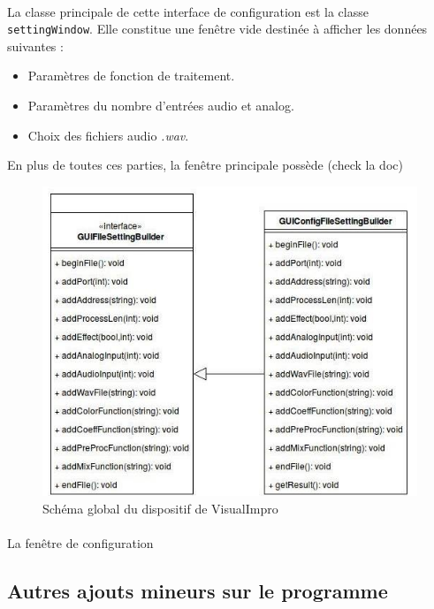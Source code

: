 \paragraph{}
La classe principale de cette interface de configuration est la
classe \verb!settingWindow!. Elle constitue une fenêtre vide
destinée à afficher les données suivantes :
\begin{itemize}
 \item Paramètres de fonction de traitement.
 \item Paramètres du nombre d'entrées audio et analog.
 \item Choix des fichiers audio \textit{.wav}.
\end{itemize}
En plus de toutes ces parties, la fenêtre principale possède (check la doc)

\begin{figure}[h]
 \centering
 \includegraphics[scale=0.5]{assets/umlBuilder.png}
 \caption{Schéma global du dispositif de VisualImpro}
 \label{schéma global}
\end{figure}

\paragraph{}
La fenêtre de configuration%

\subsection{Autres ajouts mineurs sur le programme}
